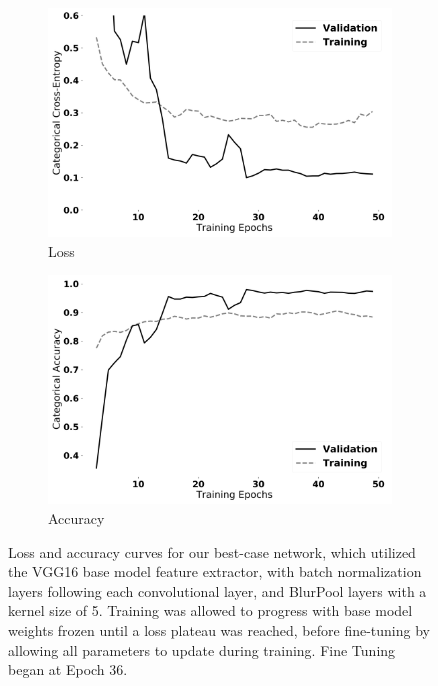 \begin{figure}[h]
	\centering
	\begin{subfigure}[b]{0.45\textwidth}
		\includegraphics[width=\textwidth]{./thesis_code/plots/20191011_BP_k5_BN_loss_bw.png}
		\caption{Loss}
		\label{fig:bestmodel_first_case}
	\end{subfigure}
	\begin{subfigure}[b]{0.45\textwidth}
		\includegraphics[width=\textwidth]{./thesis_code/plots/20191011_BP_k5_BN_acc_bw.png}
		\caption{Accuracy}
		\label{fig:bestmodel_second_case}
	\end{subfigure}
	\caption{Loss and accuracy curves for our best-case network, which utilized the VGG16 base model feature extractor, with batch normalization layers following each convolutional layer, and BlurPool layers with a kernel size of 5. Training was allowed to progress with base model weights frozen until a loss plateau was reached, before fine-tuning by allowing all parameters to update during training. Fine Tuning began at Epoch 36.}
	\label{fig:bestmodel_fig_sim}
\end{figure}

